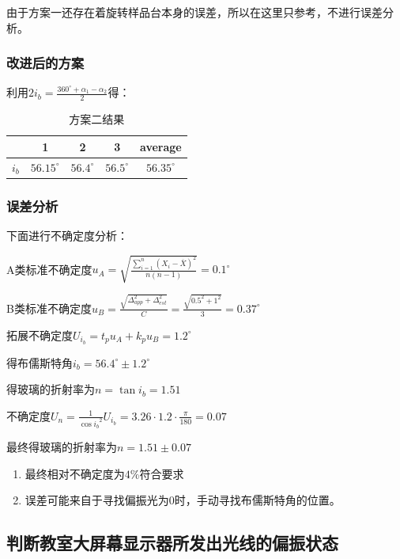 \documentclass[a4paper,UTF8]{ctexart}
\begin{document}
由于方案一还存在着旋转样品台本身的误差，所以在这里只参考，不进行误差分析。

\subsubsection{改进后的方案}

利用$2i_b = \frac{360^\circ+\alpha_1-\alpha_2}{2}$得：

\begin{table}[htb]
    \begin{center}
        \begin{tabular}{|c|c|c|c|c|}
            \hline
            & \bfseries 1 & \bfseries 2 & \bfseries 3 & \bfseries average \\
            \hline
            \bfseries $i_b$ & $56.15^\circ$ & $56.4^\circ$ & $56.5^\circ$ & $56.35^\circ$\\
            \hline
        \end{tabular}
    \end{center}
    \caption{方案二结果}
\end{table}

\subsubsection{误差分析}

下面进行不确定度分析：

A类标准不确定度$u_A = \sqrt{\frac{\sum_{i=1}^{n} (X_i - \overline{X})^2}{n(n-1)}} = 0.1^\circ$

B类标准不确定度$u_B = \frac{\sqrt{\Delta_{app}^2+\Delta_{est}^2}}{C}=\frac{\sqrt{0.5^2+1^2}}{3}=0.37^\circ$

拓展不确定度$U_{i_b} = t_p u_A + k_p u_B = 1.2^\circ$

得布儒斯特角$i_b = 56.4^\circ \pm 1.2^\circ$

得玻璃的折射率为$n = \tan{i_b} = 1.51$

不确定度$U_n = \frac{1}{\cos{i_b}^2} U_{i_b} = 3.26 \cdot 1.2 \cdot \frac{\pi}{180} = 0.07$

最终得玻璃的折射率为$n = 1.51 \pm 0.07$

\begin{enumerate}
    \item 最终相对不确定度为$4\%$符合要求
    \item 误差可能来自于寻找偏振光为0时，手动寻找布儒斯特角的位置。
\end{enumerate}

\subsection{判断教室大屏幕显示器所发出光线的偏振状态}
\end{document}
